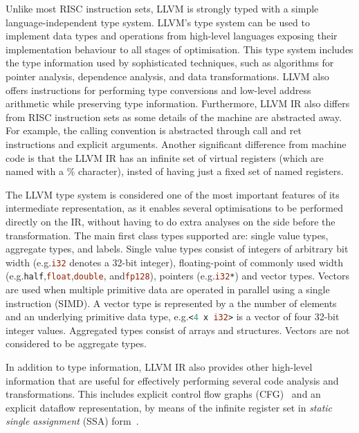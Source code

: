 Unlike most RISC instruction sets, LLVM is strongly typed with a simple language-independent type system.
LLVM's type system can be used to implement data types and operations from high-level languages exposing their implementation behaviour to all stages of optimisation.
This type system includes the type information used by sophisticated techniques, such as algorithms for pointer analysis, dependence analysis, and data transformations.
LLVM also offers instructions for performing type conversions and low-level address arithmetic while preserving type information.
Furthermore, LLVM IR also differs from RISC instruction sets as some details of the machine are abstracted away.
For example, the calling convention is abstracted through call and ret instructions and explicit arguments.
Another significant difference from machine code is that the LLVM IR has an infinite set of virtual registers (which are named with a \% character), insted of having just a fixed set of named registers.

The LLVM type system is considered one of the most important features of its intermediate representation, as it enables several optimisations to be performed directly on the IR, without having to do extra analyses on the side before the transformation.
The main first class types supported are: single value types, aggregate types, and labels.
Single value types consist of integers of arbitrary bit width (e.g.\lstinline[language=llvm,style=nasm]{i32} denotes a 32-bit integer), floating-point of commonly used width (e.g.\lstinline[language=llvm,style=nasm]{half},\lstinline[language=llvm,style=nasm]{float},\lstinline[language=llvm,style=nasm]{double}, and\lstinline[language=llvm,style=nasm]{fp128}), pointers (e.g.\lstinline[language=llvm,style=nasm]{i32*}) and vector types.
Vectors are used when multiple primitive data are operated in parallel using a single instruction (SIMD).
A vector type is represented by a the number of elements and an underlying primitive data type, e.g.\lstinline[language=llvm,style=nasm]{<4 x i32>} is a vector of four 32-bit integer values.
Aggregated types consist of arrays and structures.
Vectors are not considered to be aggregate types.

In addition to type information, LLVM IR also provides other high-level information that are useful for effectively performing several code analysis and transformations.
This includes explicit control flow graphs (CFG)~\citep{allen70} and an explicit dataflow representation, by means of the infinite register set in \textit{static single assignment} (SSA) form~\citep{alpern88,cytron89,cytron91}.

